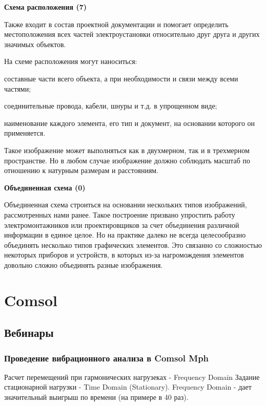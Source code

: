 \documentclass[%
	11pt,
	a4paper,
	utf8,
		]{article}
\begin{document}
\textbf{Схема расположения (7)}

Также входит в состав проектной документации и помогает определить местоположения всех частей электроустановки относительно друг друга и других значимых объектов.

На схеме расположения могут наноситься:

составные части всего объекта, а при необходимости и связи между всеми частями;

соединительные провода, кабели, шнуры и т.д. в упрощенном виде;

наименование каждого элемента, его тип и документ, на основании которого он применяется.

Такое изображение может выполняться как в двухмерном, так и в трехмерном пространстве. Но в любом случае изображение должно соблюдать масштаб по отношению к натурным размерам и расстояниям.

\textbf{Объединенная схема (0)}

Объединенная схема строиться на основании нескольких типов изображений, рассмотренных нами ранее. Такое построение призвано упростить работу электромонтажников или проектировщиков за счет объединения различной информации в единое целое. Но на практике далеко не всегда целесообразно объединять несколько типов графических элементов. Это связанно со сложностью некоторых приборов и устройств, в которых из-за нагромождения элементов довольно сложно объединять разные изображения.





\section{Comsol}

\subsection{Вебинары}

\subsubsection{Проведение вибрационного анализа в Comsol Mph}

Расчет перемещений при гармонических нагрузеках - Frequency Domain
Задание стационарной нагрузки - Time Domain (Stationary). Frequency Domain - дает значительный выигрыш по времени (на примере в 40 раз).
\end{document}
